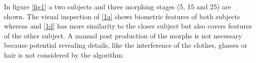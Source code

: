 In figure \ref{fig1} a two subjects and three morphing stages (5, 15 and 25) are shown. The visual inspection of \ref{1a} shows biometric features of both subjects whereas  and \ref{1d} has more similarity to the closer subject but also covers features of the other subject.
A manual post production of the morphs is not necessary because potential revealing details, like the interference  of the clothes, glasses or hair is not considered by the algorithm.

